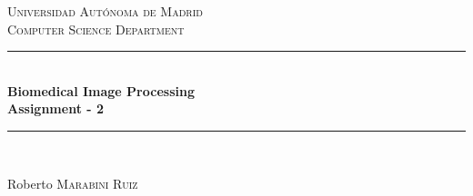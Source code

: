 \documentclass[12pt]{article} %
\begin{document}

\begin{titlepage}

\newcommand{\HRule}{\rule{\linewidth}{0.5mm}} %

\center %

\textsc{\LARGE Universidad Aut\'{o}noma de Madrid}\\[1.5cm] %
\textsc{\Large Computer Science Department}\\[0.5cm] %

\HRule \\[0.4cm]
{ \huge \bfseries Biomedical Image Processing\\[0.5cm] Assignment - 2}\\[0.4cm] %
\HRule \\[1.5cm]





\vfill %
\begin{flushright}
 \large
Roberto  \textsc{Marabini Ruiz} %
\end{flushright}

\end{titlepage}
\end{document}
